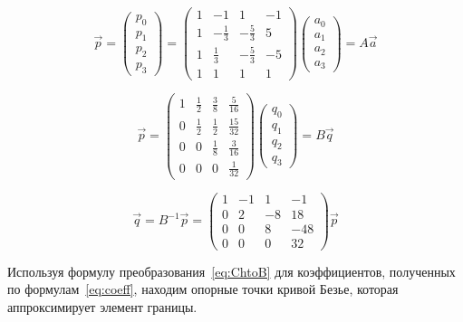 \documentclass[a4paper,12pt]{report}
\begin{document}
\begin{equation} \label{eq:ChtoB} 
\overrightarrow{p}=\left( \begin{array}{c}
p_0 \\ 
p_1 \\ 
p_2 \\ 
p_3 \end{array}
\right)=\left( \begin{array}{cccc}
1 & -1 & 1 & -1 \\ 
1 & -\frac{1}{3} & -\frac{5}{3} & 5 \\ 
1 & \frac{1}{3} & -\frac{5}{3} & -5 \\ 
1 & 1 & 1 & 1 \end{array}
\right)\left( \begin{array}{c}
a_0 \\ 
a_1 \\ 
a_2 \\ 
a_3 \end{array}
\right)=A\overrightarrow{a} 
\end{equation} 

\begin{equation} \label{eq:PtoCh} 
\overrightarrow{p}=\left( \begin{array}{cccc}
1 & \frac{1}{2} & \frac{3}{8} & \frac{5}{16} \\ 
0 & \frac{1}{2} & \frac{1}{2} & \frac{15}{32} \\ 
0 & 0 & \frac{1}{8} & \frac{3}{16} \\ 
0 & 0 & 0 & \frac{1}{32} \end{array}
\right)\left( \begin{array}{c}
q_0 \\ 
q_1 \\ 
q_2 \\ 
q_3 \end{array}
\right)=B\overrightarrow{q} 
\end{equation} 

\begin{equation} \label{eq:ChtoP} 
\overrightarrow{q}=B^{-1}\overrightarrow{p}=\left( \begin{array}{cccc}
1 & -1 & 1 & -1 \\ 
0 & 2 & -8 & 18 \\ 
0 & 0 & 8 & -48 \\ 
0 & 0 & 0 & 32 \end{array}
\right)\overrightarrow{p} 
\end{equation} 

Используя формулу преобразования~\ref{eq:ChtoB} для коэффициентов, полученных по формулам~\ref{eq:coeff}, находим опорные точки кривой Безье, которая аппроксимирует элемент границы. 
\end{document}
